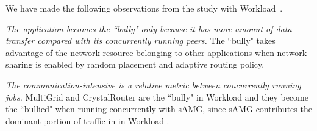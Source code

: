 We have made the following observations from the study with Workload~.

\emph{The application becomes the ``bully" only because it has more amount of data transfer compared with its concurrently running peers.} The ``bully" takes advantage of the network resource belonging to other applications when network sharing is enabled by random placement and adaptive routing policy. 

\emph{The communication-intensive is a relative metric between concurrently running jobs.} MultiGrid and CrystalRouter are the ``bully" in Workload  and they become the ``bullied" when running concurrently with sAMG, since sAMG contributes the dominant portion of traffic in  in Workload .




